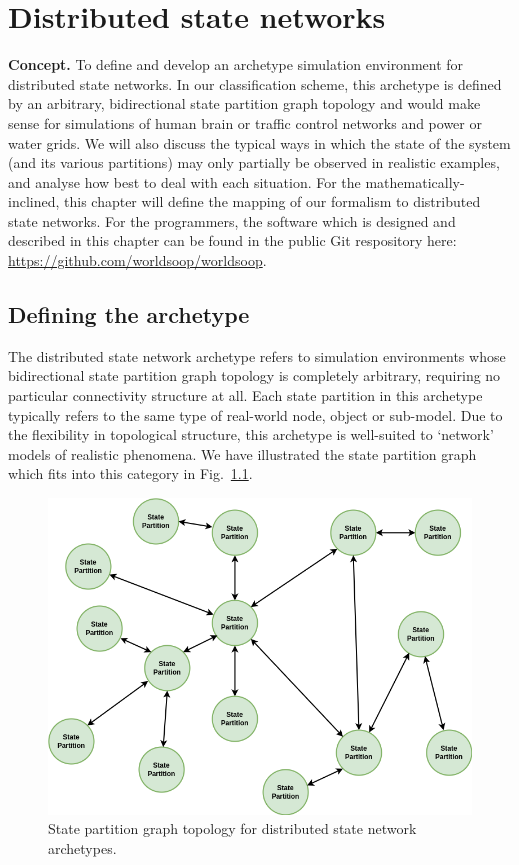 \chapter{\sffamily Distributed state networks}

{\bfseries\sffamily Concept.} To define and develop an archetype simulation environment for distributed state networks. In our classification scheme, this archetype is defined by an arbitrary, bidirectional state partition graph topology and would make sense for simulations of human brain or traffic control networks and power or water grids. We will also discuss the typical ways in which the state of the system (and its various partitions) may only partially be observed in realistic examples, and analyse how best to deal with each situation. For the mathematically-inclined, this chapter will define the mapping of our formalism to distributed state networks. For the programmers, the software which is designed and described in this chapter can be found in the public Git respository here: \href{https://github.com/worldsoop/worldsoop}{https://github.com/worldsoop/worldsoop}.

\section{\sffamily Defining the archetype}

The distributed state network archetype refers to simulation environments whose bidirectional state partition graph topology is completely arbitrary, requiring no particular connectivity structure at all. Each state partition in this archetype typically refers to the same type of real-world node, object or sub-model. Due to the flexibility in topological structure, this archetype is well-suited to `network' models of realistic phenomena. We have illustrated the state partition graph which fits into this category in Fig.~\ref{fig:state-partition-graph-distributed-state-networks}.

\begin{figure}[h]
\centering
\includegraphics[width=12cm]{images/chapter-8-state-partition-graph.drawio.png}
\caption{State partition graph topology for distributed state network archetypes.}
\label{fig:state-partition-graph-distributed-state-networks}
\end{figure}

